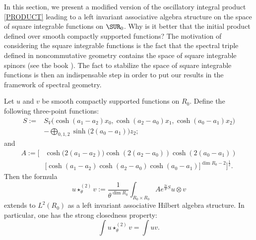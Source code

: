 In this section, we present a modified version of the oscillatory integral product \eqref{PRODUCT} leading to a left invariant associative algebra structure on the space of square integrable functions on $\SUR_0$. Why is it better that the initial product defined over smooth compactly supported functions? The motivation of considering the square integrable functions is the fact that the spectral triple defined in noncommutative geometry contains the space of square integrable spinors (see the book \cite{ConnesNCG}). The fact to stabilize the space of square integrable functions is then an indispensable step in order to put our results in the framework of spectral geometry.

\begin{theorem}

 Let $u$ and $v$ be smooth compactly supported functions on $R_0$. Define the following three-point functions:
 \begin{equation}
\begin{split}
S:=& S_V\big(\cosh(a_1-a_2)x_0, \cosh(a_2-a_0)x_1, \cosh(a_0-a_1)x_2\big)\\
&-\bigoplus_{0,1,2}\sinh\big(2(a_0-a_1)\big)z_2;
\end{split}
\end{equation}
and
\[
\begin{split}
A:= \Big[&\cosh\big(2(a_1-a_2)\big)\cosh(2(a_2- a_0))\cosh(2(a_0-a_1))\\
& \big[\cosh(a_1-a_2)\cosh(a_2- a_0)\cosh(a_0-a_1)\big]^{\dim R_0-2}\Big]^{\frac{1}{2}}.
\end{split}
\]
Then the formula
\begin{equation}\label{HILB}
u\star^{(2)}_\theta v:=\frac{1}{\theta^{\dim R_0}}
\int_{R_0\times R_0}Ae^{\frac{2i}{\theta}S}u\otimes v
\end{equation}
extends to $L^2(R_0)$ as a left invariant associative Hilbert algebra structure. In particular, one has the strong closedness property:
\begin{equation*}
\int u\star^{(2)}_\theta v=\int uv.
\end{equation*}
\label{thmL2}
\end{theorem}
